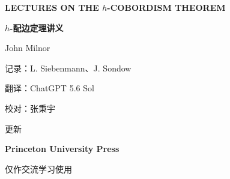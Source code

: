 \begin{titlepage}
  \thispagestyle{empty}
  \centering
  {\bfseries LECTURES ON THE $h$-COBORDISM THEOREM\par}
  \vspace{1.1cm}
  {\bfseries $h$-配边定理讲义\par}
  \vspace{2.2cm}
  { John Milnor\par}
  \vspace{1.2cm}
  { 记录：L. Siebenmann、J. Sondow\par}
  \vspace{1.5cm}
  { 翻译：ChatGPT 5.6 Sol\par}
  { 校对：张秉宇\par}
  \vspace{0.8cm}
  \makeatletter
  { \@date 更新\par}
  \makeatother
  \vfill
  { \textbf{Princeton University Press}\par}
  { 仅作交流学习使用\par}
\end{titlepage}
